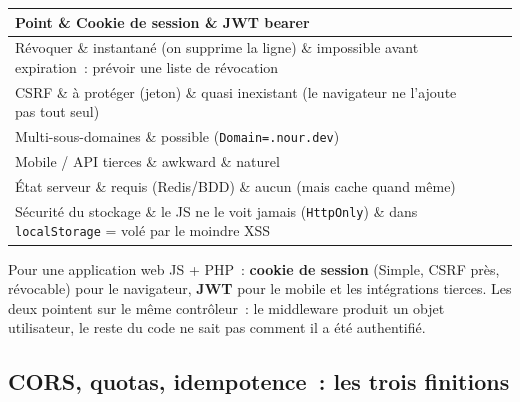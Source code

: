 \documentclass[12pt,a4paper,twoside,openright]{book}
\makeatletter
\newenvironment{tabz}[1]{\rowcolors{2}{white}{tralight}%
  \small\setlength{\tabcolsep}{5pt}\setlength{\LTpre}{3pt}\setlength{\LTpost}{3pt}%
  \begin{longtable}{@{}#1@{}}\toprule}
  {\bottomrule\end{longtable}\normalfont\setlength{\tabcolsep}{6pt}}
\newcommand{\thd}[1]{\textbf{\color{white}#1}}
\newcommand{\headrow}{\rowcolor{theadbg}}
\makeatother
\begin{document}
\begin{tabz}{llX}
  \headrow \thd{Point} \& \thd{Cookie de session} \& \thd{JWT bearer} \\
  \midrule
  R\'evoquer \& instantan\'e (on supprime la ligne) \& impossible avant expiration~: pr\'evoir une liste de r\'evocation \\
  CSRF \& \`a prot\'eger (jeton) \& quasi inexistant (le navigateur ne l'ajoute pas tout seul) \\
  Multi-sous-domaines \& possible (\verb|Domain=.nour.dev|) \\
  Mobile / API tierces \& awkward \& naturel \\
  \'Etat serveur \& requis (Redis/BDD) \& aucun (mais cache quand m\^eme) \\
  S\'ecurit\'e du stockage \& le JS ne le voit jamais (\verb|HttpOnly|) \& dans \verb|localStorage| = vol\'e par le moindre XSS \\
\end{tabz}

\begin{astuce}
Pour une application web JS + PHP~: \textbf{cookie de session} (Simple, CSRF pr\`es, r\'evocable) pour le
navigateur, \textbf{JWT} pour le mobile et les int\'egrations tierces. Les deux pointent sur le m\^eme
contr\^oleur~: le middleware produit un objet utilisateur, le reste du code ne sait pas comment il a \'et\'e
authentifi\'e.
\end{astuce}

\subsection{CORS, quotas, idempotence~: les trois finitions}
\end{document}
